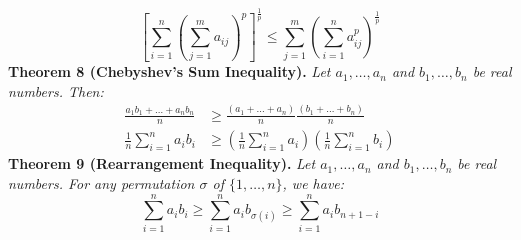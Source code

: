 \documentclass[a4paper,11pt]{article}
\begin{document}
\[
\left[ \sum_{i=1}^n \left( \sum_{j=1}^m a_{ij} \right)^p \right]^\frac{1}{p} \leq \sum_{j=1}^m \left( \sum_{i=1}^n a_{ij}^p \right)^\frac{1}{p} 
\]
%
%
\textbf{Theorem 8 (Chebyshev's Sum Inequality).} \textit{Let $a_1, \dots, a_n$ and $b_1, \dots, b_n$ be real numbers. Then:}
\begin{align*}
    \frac{a_1b_1 + \dots + a_nb_n}{n} &\geq \frac{(a_1 + \dots + a_n)}{n} \frac{(b_1 + \dots + b_n)}{n} \\
    \frac{1}{n} \sum_{i=1}^n a_ib_i &\geq \left( \frac{1}{n} \sum_{i=1}^n a_i \right) \left( \frac{1}{n} \sum_{i=1}^n b_i \right)
\end{align*}
%
%
\textbf{Theorem 9 (Rearrangement Inequality).} \textit{Let $a_1, \dots, a_n$ and $b_1, \dots, b_n$ be real numbers. For any permutation $\sigma$ of $\{1, \dots, n\}$, we have:}
\[
\sum_{i=1}^n a_ib_i \geq \sum_{i=1}^n a_ib_{\sigma(i)} \geq \sum_{i=1}^n a_ib_{n+1-i}
\]
\end{document}

